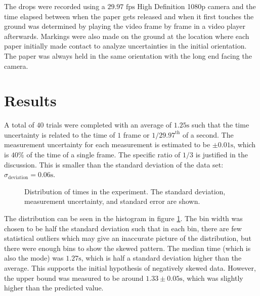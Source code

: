 \documentclass[%
 reprint,
 amsmath,amssymb,
 aps,
]{revtex4-2}
\begin{document}
The drops were recorded using a $29.97\text{ fps}$ High Definition 1080p camera and the time elapsed between when the paper gets released and when it first touches the ground was determined by playing the video frame by frame in a video player afterwards. Markings were also made on the ground at the location where each paper initially made contact to analyze uncertainties in the initial orientation. The paper was always held in the same orientation with the long end facing the camera.

\section{Results}
A total of $40$ trials were completed with an average of $1.25\si{\second}$ such that the time uncertainty is related to the time of $1$ frame or $1/29.97^\text{th}$ of a second. The measurement uncertainty for each measurement is estimated to be $\pm 0.01 \si{\second}$, which is $40\%$ of the time of a single frame. The specific ratio of $1/3$ is justified in the discussion. This is smaller than the standard deviation of the data set: $\sigma_\text{deviation}=0.06\si{\second}$.
\begin{figure}[!h]
    \caption{Distribution of times in the experiment. The standard deviation, measurement uncertainty, and standard error are shown.}
    \label{fig:histogram}
\end{figure}
The distribution can be seen in the histogram in figure \ref{fig:histogram}. The bin width was chosen to be half the standard deviation such that in each bin, there are few statistical outliers which may give an inaccurate picture of the distribution, but there were enough bins to show the skewed pattern. The median time (which is also the mode) was $1.27 \si{\second}$, which is half a standard deviation higher than the average. This supports the initial hypothesis of negatively skewed data. However, the upper bound was measured to be around $1.33\pm 0.05\si{\second}$, which was slightly higher than the predicted value.
\end{document}
